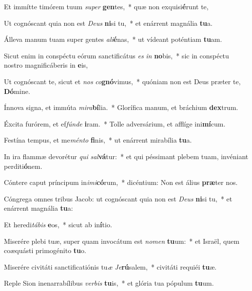 \item Et immítte timórem tuum \textit{su}\textit{per} \textbf{gen}tes,~* quæ non exquisi\textbf{é}runt te,
\item Ut cognóscant quia non est \textit{De}\textit{us} \textbf{ni}si tu,~* et enárrent magnália \textbf{tu}a.
\item Álleva manum tuam super gentes \textit{a}\textit{li}\textbf{é}nas,~* ut vídeant poténtiam \textbf{tu}am.
\item Sicut enim in conspéctu eórum sanctificátus \textit{es} \textit{in} \textbf{no}bis,~* sic in conspéctu nostro magnificáberis in \textbf{e}is,
\item Ut cognóscant te, sicut et \textit{nos} \textit{co}\textbf{gnó}vimus,~* quóniam non est Deus præter te, \textbf{Dó}mine.
\item Ínnova signa, et immúta \textit{mi}\textit{ra}\textbf{bí}lia.~* Glorífica manum, et bráchium \textbf{dex}trum.
\item Éxcita furórem, et ef\textit{fún}\textit{de} \textbf{i}ram.~* Tolle adversárium, et afflíge ini\textbf{mí}cum.
\item Festína tempus, et me\textit{mén}\textit{to} \textbf{fi}nis,~* ut enárrent mirabília \textbf{tu}a.
\item In ira flammæ devorétur \textit{qui} \textit{sal}\textbf{vá}tur:~* et qui péssimant plebem tuam, invéniant perditi\textbf{ó}nem.
\item Cóntere caput príncipum in\textit{i}\textit{mi}\textbf{có}rum,~* dicéntium: Non est álius \textbf{præ}ter nos.
\item Cóngrega omnes tribus Jacob: ut cognóscant quia non est \textit{De}\textit{us} \textbf{ni}si tu,~* et enárrent magnália \textbf{tu}a:
\item Et heredi\textit{tá}\textit{bis} \textbf{e}os,~* sicut ab in\textbf{í}tio.
\item Miserére plebi tuæ, super quam invocátum est \textit{no}\textit{men} \textbf{tu}um:~* et Israël, quem coæquásti primogénito \textbf{tu}o.
\item Miserére civitáti sanctificatiónis tu\textit{æ} \textit{Je}\textbf{rú}salem,~* civitáti requiéi \textbf{tu}æ.
\item Reple Sion inenarrabílibus \textit{ver}\textit{bis} \textbf{tu}is,~* et glória tua pópulum \textbf{tu}um.
